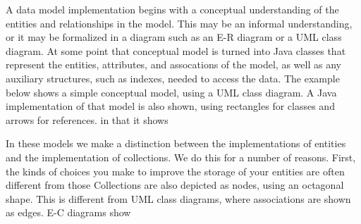 A data model implementation begins with a conceptual understanding of the
entities and relationships in the model.  This may be an informal understanding,
or it may be formalized in a diagram such as an E-R diagram or a UML class
diagram.  At some point that conceptual model is turned into Java classes that
represent the entities, attributes, and assocations of the model, as well as any
auxiliary structures, such as indexes, needed to access the data.  The example
below shows a simple conceptual model, using a UML class diagram.  A Java
implementation of that model is also shown, using rectangles for classes and
arrows for references.  %
in that it shows


In these models we make a distinction between the implementations of entities
and the implementation of collections.  We do this for a number of reasons. 
First, the kinds of choices you make to improve the storage of your entities are
often different from those Collections are also depicted as nodes, using an
octagonal shape.  This is different from UML class diagrams, where associations
are shown as edges. E-C diagrams show


\begin{comment}
\section{Conventions Used in This Book}

[NOTE(GSS): add data structure to the list.  possibly add relationship as well.]

Terms like object can have different meanings in the literature.  The following are the conventions used throughout this book.

\begin{itemize}
\item A \textit{class} is a Java class. A class name, for example \texttt{String}, always appears in type-writer font. 
\item A \textit{data model} is a set of classes that represents one or more logical concepts.
\item Finally, an \textit{object} is an instance of a class, that exists at runtime occupying a contiguous section of memory.
\end{itemize} 
\end{comment}





